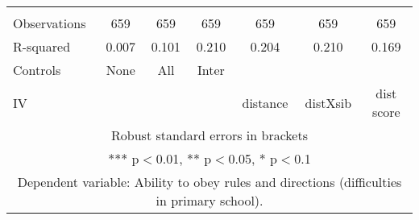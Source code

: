 \begin{tabular}{lcccccc}
 &  &  &  &  &  &  \\
Observations & 659 & 659 & 659 & 659 & 659 & 659 \\
R-squared & 0.007 & 0.101 & 0.210 & 0.204 & 0.210 & 0.169 \\
Controls & None & All & Inter &  &  &  \\
 IV &  &  &  & distance & distXsib & dist score \\ \hline
\multicolumn{7}{c}{ Robust standard errors in brackets} \\
\multicolumn{7}{c}{ *** p$<$0.01, ** p$<$0.05, * p$<$0.1} \\
\multicolumn{7}{c}{ Dependent variable: Ability to obey rules and directions (difficulties in primary school).} \\
\end{tabular}
